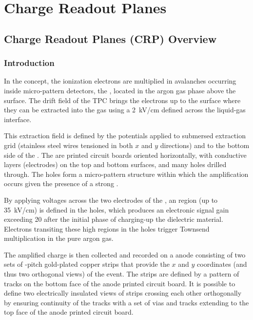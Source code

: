 \chapter{Charge Readout Planes}
\label{ch:fddp-CRP}

\section{Charge Readout Planes (CRP) Overview}
\label{sec:fddp-crp-ov}


\subsection{Introduction}
\label{sec:fddp-crp-intro}

In the \dual \lartpc concept, the ionization electrons are multiplied in avalanches  occurring inside micro-pattern detectors, the , located in the argon gas phase above the \lar %
surface. The drift field of the TPC brings the electrons up to the \lar surface where they can  be    extracted into the gas using a 
\SI{2}{kV/cm} \efield defined across the liquid-gas interface.

This extraction field is defined by the potentials applied to submersed extraction grid (stainless steel wires tensioned in both $x$ and $y$ directions) and to the bottom side of the . The  are printed circuit boards oriented horizontally, with conductive layers (electrodes) on the top and bottom surfaces, and many holes drilled through.  The holes form a micro-pattern structure within which the amplification occurs given the presence of a strong \efield.

By applying voltages across the two electrodes of the , an \efield region (up to \SI{35}{kV/cm}) is defined in the holes, which produces an electronic signal gain exceeding \num{20} after the initial phase of charging-up the  dielectric material.  Electrons transiting these high \efield regions in the holes trigger Townsend multiplication in the pure argon gas.

The amplified charge is then collected and recorded on a \twod anode consisting of two sets of \dpstrippitch-pitch gold-plated copper strips that provide the $x$ and $y$ coordinates (and thus two orthogonal views) of the event. The strips are defined by a pattern of tracks on the bottom face of the anode printed circuit board. It is possible  to define two electrically insulated views of strips crossing each other orthogonally by ensuring continuity of the tracks with a set of vias and tracks extending to the top face of the anode printed circuit board.

